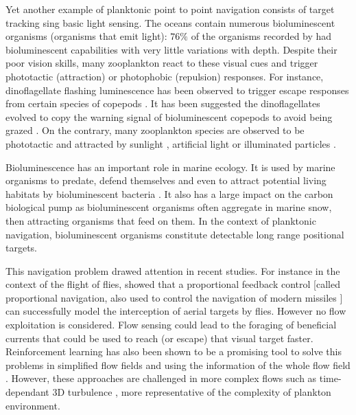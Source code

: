 Yet another example of planktonic point to point navigation consists of target tracking sing basic light sensing.
The oceans contain numerous bioluminescent organisms (organisms that emit light): $76\%$ of the organisms recorded by \citet{martini2017quantification} had bioluminescent capabilities with very little variations with depth.
Despite their poor vision skills, many zooplankton react to these visual cues and trigger phototactic (attraction) or photophobic (repulsion) responses.
For instance, dinoflagellate flashing luminescence has been observed to trigger escape responses from certain species of copepods \citep{buskey1983behavioral}.
It has been suggested the dinoflagellates evolved to copy the warning signal of bioluminescent copepods to avoid being grazed \citep{buskey1985behavioral}.
On the contrary, many zooplankton species are observed to be phototactic and attracted by sunlight \citep{ringelberg1999photobehaviour}, artificial light \citep{jekely2008mechanism, krafft2021antarctic, stearns1984photosensitivity} or illuminated particles \citep{tanaka2019biased}.

Bioluminescence has an important role in marine ecology. 
It is used by marine organisms to predate, defend themselves and even to attract potential living habitats by bioluminescent bacteria  \citep{haddock2010bioluminescence}.
It also has a large impact on the carbon biological pump as bioluminescent organisms often aggregate in marine snow, then attracting organisms that feed on them.
In the context of planktonic navigation, bioluminescent organisms constitute detectable long range positional targets.

This navigation problem drawed attention in recent studies. For instance in the context of the flight of flies, \citet{fabian2018interception} showed that a proportional feedback control [called proportional navigation, also used to control the navigation of modern missiles \citep{shneydor1998missile}] can successfully model the interception of aerial targets by flies.
However no flow exploitation is considered.
Flow sensing could lead to the foraging of beneficial currents that could be used to reach (or escape) that visual target faster.
Reinforcement learning has also been shown to be a promising tool to solve this problems in simplified flow fields \citep{gunnarson2021learning} and using the information of the whole flow field \citep{biferale2019zermelo}.
However, these approaches are challenged in more complex flows such as time-dependant 3D turbulence \citep{alageshan2020machine}, more representative of the complexity of plankton environment.

